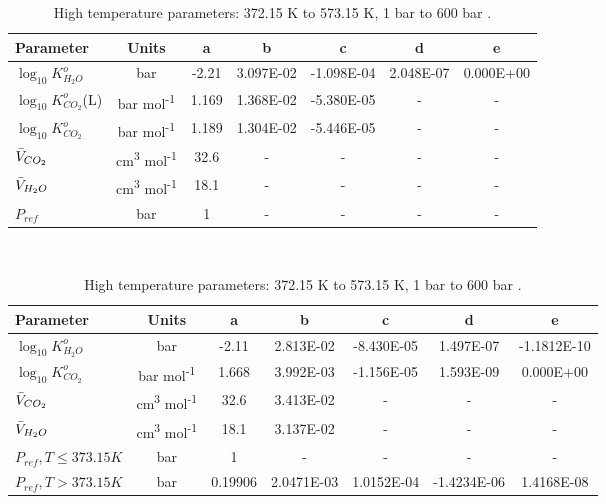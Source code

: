 \begin{table}[H]
    \caption{Low   temperature parameters: 285.15 K to 382.15 K , 1 bar to 600 bar \cite{Spycher2003}.}
    \centering
    \label{table:EquibDataLow}
    \begin{tabular}{|p{6em} c c c c c c|}
        \hline
        \rowcolor{bluepoli!40} %
        \textbf{Parameter}& \textbf{Units} & \textbf{a} & \textbf{b} & \textbf{c} & \textbf{d} & \textbf{e} \T\B \\
        \hline \hline
        \(\log_{10}K_{H_2O}^{o}\) & bar & -2.21 & 3.097E-02 & -1.098E-04 & 2.048E-07 & 0.000E+00 \T\B \\
        \(\log_{10}K_{CO_2}^{o}\)(L) & bar mol\textsuperscript{-1} & 1.169 & 1.368E-02 & -5.380E-05 & - & - \T\B\\
        \(\log_{10}K_{CO_2}^{o}\) & bar mol\textsuperscript{-1} & 1.189 & 1.304E-02 & -5.446E-05 & - & - \B\\
        \(\Bar{V}_{CO_2}\) & cm\textsuperscript{3} mol\textsuperscript{-1} & 32.6 & - & - & - & - \B\\
        \(\Bar{V}_{H_2O}\) & cm\textsuperscript{3} mol\textsuperscript{-1} & 18.1 & - & - & - & - \B\\
        \(P_{ref}\) & bar & 1 & - & - & - & - \B\\
        \hline
    \end{tabular}
    \\[10pt]

    \caption{High   temperature parameters: 372.15 K to 573.15 K, 1 bar  to 600 bar \cite{Spycher2009}.}
    \centering 
    \label{table:EquibDataHigh}
    \begin{tabular}{|p{8.25em} c c c c c c|}
        \hline
        \rowcolor{bluepoli!40} %
        \textbf{Parameter}& \textbf{Units} & \textbf{a} & \textbf{b} & \textbf{c} & \textbf{d} & \textbf{e} \T\B \\
        \hline \hline
        \(\log_{10}K_{H_2O}^{o}\) & bar & -2.11 & 2.813E-02 & -8.430E-05 & 1.497E-07 & -1.1812E-10 \T\B \\
        \(\log_{10}K_{CO_2}^{o}\) & bar mol\textsuperscript{-1} & 1.668 & 3.992E-03 & -1.156E-05 & 1.593E-09 & 0.000E+00 \T\B\\
        \(\Bar{V}_{CO_2}\) & cm\textsuperscript{3} mol\textsuperscript{-1} & 32.6 & 3.413E-02 & - & - & - \B\\
        \(\Bar{V}_{H_2O}\) & cm\textsuperscript{3} mol\textsuperscript{-1} & 18.1 & 3.137E-02 & - & - & - \B\\
        \(P_{ref}, T\leq373.15 K\) & bar & 1 & - & - & - & - \B\\
        \(P_{ref}, T>373.15 K\) & bar & 0.19906 & 2.0471E-03 & 1.0152E-04 & -1.4234E-06 & 1.4168E-08 \B\\
        \hline
    \end{tabular}
    \\[10pt]
\end{table}